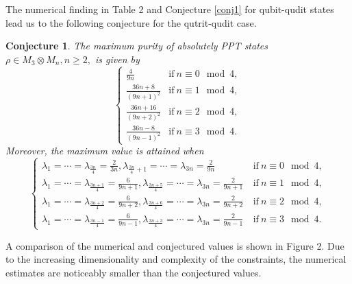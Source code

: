 \documentclass[reqno, 12pt,a4letter]{amsart}
\theoremstyle{definition}
\theoremstyle{plain}
\newtheorem {conjecture}{Conjecture}[section]
\begin{document}
The numerical finding in Table 2 and Conjecture \ref{conj1} for qubit-qudit states lead us to the following conjecture for the qutrit-qudit case.
\begin{conjecture} \label{conj2} The maximum purity of  absolutely PPT states $\rho \in M_3\otimes M_n, n\ge 2,$ is given by
	$$\begin{cases}
		\frac{4}{9n} \ &\text{if}\ n \equiv 0 \mod 4,   \\
		
		\frac{36n+8}{(9n+1)^2} &\text{if}\ n \equiv 1 \mod 4 , \\
		\frac{36n+16}{(9n+2)^2} &\text{if}\ n \equiv 2 \mod 4 , \\
		\frac{36n-8}{(9n-1)^2}  &\text{if}\ n \equiv 3 \mod 4.
	\end{cases}$$
	Moreover, the maximum value is attained when $$\begin{cases}
		\lambda_1= \cdots =\lambda_{\frac{3n}{4}}=\frac{2}{3n}, \lambda_{\frac{3n}{4}+1}=\cdots=\lambda_{3n}=\frac{2}{9n}  \ &\text{if}\ n \equiv 0 \mod 4,   \\
		
		\lambda_1= \cdots =\lambda_{\frac{3n+1}{4}}=\frac{6}{9n+1}, \lambda_{\frac{3n+5}{4}}=\cdots=\lambda_{3n}=\frac{2}{9n+1} \ &\text{if}\ n \equiv 1 \mod 4, \\
		\lambda_1= \cdots =\lambda_{\frac{3n+2}{4}}=\frac{6}{9n+2}, \lambda_{\frac{3n+6}{4}}=\cdots=\lambda_{3n}=\frac{2}{9n+2} \ &\text{if}\ n \equiv 2 \mod 4, \\
		\lambda_1= \cdots =\lambda_{\frac{3n-1}{4}}=\frac{6}{9n-1}, \lambda_{\frac{3n+3}{4}}=\cdots=\lambda_{3n}=\frac{2}{9n-1} \ &\text{if}\ n \equiv 3 \mod 4.
		
	\end{cases}$$ 
\end{conjecture}
A comparison of the numerical and conjectured values is shown in Figure 2. Due to the increasing dimensionality and complexity of the constraints, the numerical estimates are noticeably smaller than the conjectured values.  
\end{document}
